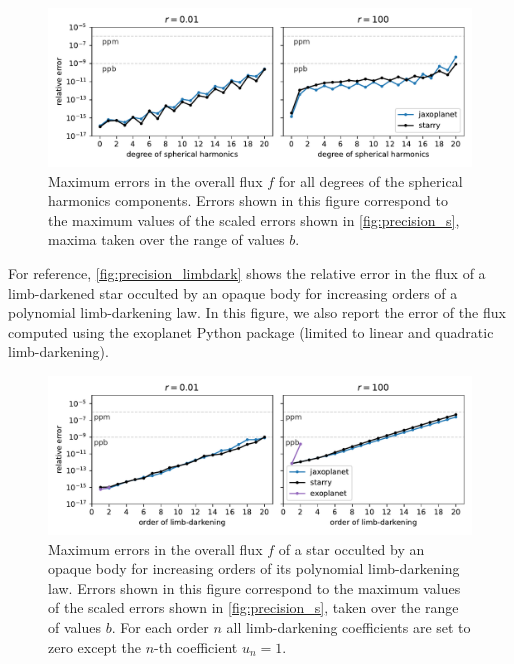 \documentclass[modern]{aastex631}
\begin{document}
\begin{figure}[H]
    \begin{center}
        \includegraphics[width=\textwidth]{../workflows/precision/figures/error_degree.pdf}
        \caption{Maximum errors in the overall flux $f$ for all degrees of the spherical harmonics components. Errors shown in this figure correspond to the maximum values of the scaled errors shown in \autoref{fig:precision_s}, maxima taken over the range of values $b$. }
        \label{fig:precision_degree}
    \end{center}
\end{figure}
For reference, \autoref{fig:precision_limbdark} shows the relative error in the flux of a limb-darkened star occulted by an opaque body for increasing orders of a polynomial limb-darkening law. In this figure, we also report the error of the flux computed using the \textsf{exoplanet} Python package (limited to linear and quadratic limb-darkening).
\begin{figure}[H]
    \begin{center}
        \includegraphics[width=\textwidth]{../workflows/precision/figures/limbdark_error.PDF}
        \caption{Maximum errors in the overall flux $f$ of a star occulted by an opaque body for increasing orders of its polynomial limb-darkening law. Errors shown in this figure correspond to the maximum values of the scaled errors shown in \autoref{fig:precision_s}, taken over the range of values $b$. For each order $n$ all limb-darkening coefficients are set to zero except the $n$-th coefficient $u_n=1$. }
        \label{fig:precision_limbdark}
    \end{center}
\end{figure}
\end{document}
